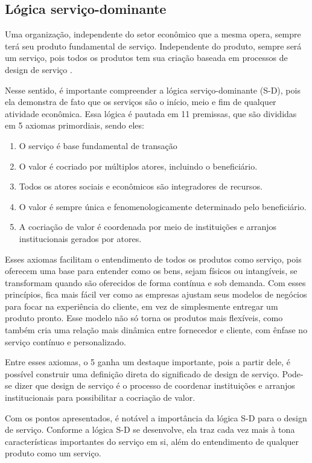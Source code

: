 \subsection{Lógica serviço-dominante}

Uma organização, independente do setor econômico que a mesma opera, sempre terá seu produto fundamental de serviço. Independente do produto, sempre será um serviço, pois todos os produtos tem sua criação baseada em processos de design de serviço \cite{Stickdorn2019}.

Nesse sentido, é importante compreender a lógica serviço-dominante (S-D), pois ela demonstra de fato que os serviços são o início, meio e fim de qualquer atividade econômica. Essa lógica é pautada em 11 premissas, que são divididas em 5 axiomas primordiais, sendo eles:

\begin{enumerate}
	\item O serviço é base fundamental de transação
	\item O valor é cocriado por múltiplos atores, incluindo o beneficiário.
	\item Todos os atores sociais e econômicos são integradores de recursos.
	\item O valor é sempre única e fenomenologicamente determinado pelo beneficiário.
	\item A cocriação de valor é coordenada por meio de instituições e arranjos institucionais gerados por atores. 
\end{enumerate}

Esses axiomas facilitam o entendimento de todos os produtos como serviço, pois oferecem uma base para entender como os bens, sejam físicos ou intangíveis, se transformam quando são oferecidos de forma contínua e sob demanda. Com esses princípios, fica mais fácil ver como as empresas ajustam seus modelos de negócios para focar na experiência do cliente, em vez de simplesmente entregar um produto pronto. Esse modelo não só torna os produtos mais flexíveis, como também cria uma relação mais dinâmica entre fornecedor e cliente, com ênfase no serviço contínuo e personalizado.

Entre esses axiomas, o 5 ganha um destaque importante, pois a partir dele, é possível construir uma definição direta do significado de design de serviço. Pode-se dizer que design de serviço é o processo de coordenar instituições e arranjos institucionais para possibilitar a cocriação de valor.

Com os pontos apresentados, é notável a importância da lógica S-D para o design de serviço. Conforme a lógica S-D se desenvolve, ela traz cada vez mais à tona características importantes do serviço em si, além do entendimento de qualquer produto como um serviço.

